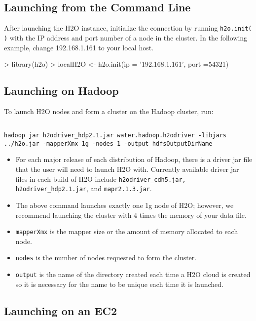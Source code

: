 \documentclass{article}[11pt]
\begin{document}
\subsection{Launching from the Command Line}

After launching the H2O instance, initialize the connection by running {\texttt{h2o.init( )}} with the IP address and port number of a node in the cluster. In the following example, change 192.168.1.161 to your local host. 
\begin{spverbatim}
> library(h2o)
> localH2O <- h2o.init(ip = '192.168.1.161', port =54321)
\end{spverbatim}

\subsection{Launching on Hadoop}

To launch H2O nodes and form a cluster on the Hadoop cluster, run:

\begin{lstlisting}[breaklines,basicstyle=\ttfamily]

hadoop jar h2odriver_hdp2.1.jar water.hadoop.h2odriver -libjars ../h2o.jar -mapperXmx 1g -nodes 1 -output hdfsOutputDirName

\end{lstlisting}

\begin{itemize}
\item For each major release of each distribution of Hadoop, there is a driver jar file that the user will need to launch H2O with. Currently available driver jar files in each build of H2O include {\texttt{h2odriver_cdh5.jar, h2odriver_hdp2.1.jar}}, and {\texttt{mapr2.1.3.jar}}.
\item The above command launches exactly one 1g node of H2O; however,  we recommend launching the cluster with 4 times the memory of your data file.
\item{\texttt{mapperXmx}} is the mapper size or the amount of memory allocated to each node.
\item{\texttt{nodes}} is the number of nodes requested to form the cluster.
\item{\texttt{output}} is the name of the directory created each time a H2O cloud is created so it is necessary for the name to be unique each time it is launched.
\end{itemize}


\subsection{Launching on an EC2}
\end{document}
